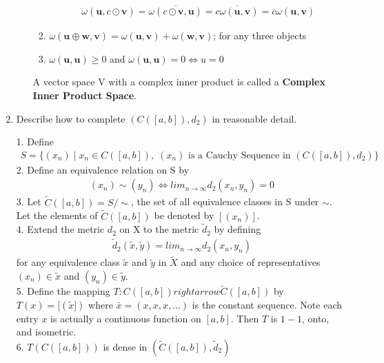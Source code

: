 \documentclass[11pt]{SelfArxOneColBMN}
\begin{document}
\begin{enumerate}
\begin{solution}
\begin{itemize}
\begin{enumerate}
        \begin{eqnarray*}
          \omega(\mathbf{u},c\odot\mathbf{v}) = \overline{\omega(c\odot\mathbf{v},\mathbf{u})} = \overline{c\omega(\mathbf{u,v})} = \overline{c}\omega(\mathbf{u,v})
        \end{eqnarray*}
        \item $\omega(\mathbf{u} \oplus \mathbf{w,v}) = \omega(\mathbf{u,v}) + \omega(\mathbf{w,v})$; for any three objects
        \item $\omega(\mathbf{u,u}) \geq 0$ and $\omega(\mathbf{u,u}) = 0 \iff u = 0$
      \end{enumerate}
      A vector space V with a complex inner product is  called a \textbf{Complex Inner Product Space}.
    \end{itemize}
  \end{solution}
  \item Describe how to complete $(C([a,b]),d_2)$ in reasonable detail.
  \begin{solution}
    1. Define
    \begin{eqnarray*}
      S = \{(x_n)\;|\;x_n \in C([a,b]),\;(x_n)\text{ is a Cauchy Sequence in }(C([a,b]),d_2)\}
    \end{eqnarray*}
    2. Define an equivalence relation on S by
    \begin{eqnarray*}
      (x_n) \sim (y_n) \iff lim_{n\rightarrow\infty}d_2(x_n,y_n) = 0
    \end{eqnarray*}
    3. Let $\widetilde{C}([a,b]) = S/\sim$, the set of all equivalence classes in S under $\sim$. Let the elements of $\widetilde{C}([a,b])$ be denoted by $[(x_n)]$.\\
    4. Extend the metric $d_2$ on X to the metric $\widetilde{d}_2$ by defining 
    \begin{eqnarray*}
      \widetilde{d}_2(\widetilde{x},\widetilde{y}) = lim_{n\rightarrow\infty}d_2(x_n,y_n)
    \end{eqnarray*}
    for any equivalence class $\widetilde{x}$ and $\widetilde{y}$ in $\widetilde{X}$ and any choice of representatives $(x_n) \in \widetilde{x}$ and $(y_n) \in \widetilde{y}$.\\
    5. Define the mapping $T: C([a,b])rightarrow \widetilde{C}([a,b])$ by $T(x) = [(\widetilde{x}])$ where $\bar{x} = (x,x,x,...)$ is the constant sequence. Note each entry $x$ is actually a continuous function on $[a,b]$. Then $T$ is $1 -1$, onto, and isometric.\\
    6. $T(C([a,b]))$ is dense in $(\widetilde{C}([a,b]),\widetilde{d}_2)$\\

\end{solution}
\end{enumerate}
\end{document}
